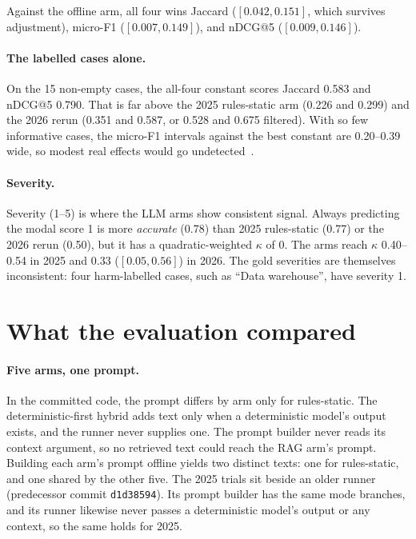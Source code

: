 \documentclass[10pt,twocolumn]{article}
\begin{document}
Against the offline arm, all four wins Jaccard ($[0.042, 0.151]$, which
survives adjustment), micro-F1 ($[0.007, 0.149]$), and nDCG@5
($[0.009, 0.146]$).

\paragraph{The labelled cases alone.} On the 15 non-empty cases, the all-four
constant scores Jaccard 0.583 and nDCG@5 0.790. That is far above the 2025
rules-static arm (0.226 and 0.299) and the 2026 rerun (0.351 and 0.587, or 0.528
and 0.675 filtered). With so few informative cases, the micro-F1 intervals
against the best constant are 0.20--0.39 wide, so modest real effects would go
undetected~\cite{card2020}.

\paragraph{Severity.} Severity (1--5) is where the LLM arms show consistent
signal. Always predicting the modal score 1 is more \emph{accurate} (0.78) than
2025 rules-static (0.77) or the 2026 rerun (0.50), but it has a
quadratic-weighted $\kappa$ of 0. The arms reach $\kappa$ 0.40--0.54 in 2025
and 0.33 ($[0.05, 0.56]$) in 2026. The gold severities are themselves
inconsistent: four harm-labelled cases, such as ``Data warehouse'', have
severity 1.

\section{What the evaluation compared}
\label{sec:audit}

\paragraph{Five arms, one prompt.} In the committed code, the prompt differs by
arm only for rules-static. The deterministic-first hybrid adds text only when a
deterministic model's output exists, and the runner never supplies one. The
prompt builder never reads its context argument, so no retrieved text could
reach the RAG arm's prompt. Building each arm's prompt offline yields two
distinct texts: one for rules-static, and one shared by the other five. The
2025 trials sit beside an older runner (predecessor commit
\texttt{d1d38594}). Its prompt builder has the same mode branches, and its
runner likewise never passes a deterministic model's output or any context,
so the same holds for 2025.
\end{document}
